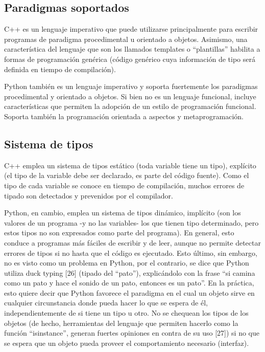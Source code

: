 \subsection{Paradigmas soportados}

C++ es un lenguaje imperativo que puede utilizarse principalmente para escribir
programas de paradigma procedimental u orientado a objetos. Asimismo, una
característica del lenguaje que son los llamados templates o ``plantillas''
habilita a formas de programación genérica (código genérico cuya información de
tipo será definida en tiempo de compilación).

Python también es un lenguaje imperativo y soporta fuertemente los paradigmas
procedimental y orientado a objetos. Si bien no es un lenguaje funcional,
incluye características que permiten la adopción de un estilo de programación
funcional. Soporta también la programación orientada a aspectos y
metaprogramación.

\subsection{Sistema de tipos}

C++ emplea un sistema de tipos estático (toda variable tiene un tipo),
explícito (el tipo de la variable debe ser declarado, es parte del código
fuente). Como el tipo de cada variable se conoce en tiempo de compilación,
muchos errores de tipado son detectados y prevenidos por el compilador.

Python, en cambio, emplea un sistema de tipos dinámico, implícito (son los
valores de un programa -y no las variables- los que tienen tipo determinado,
pero estos tipos no son expresados como parte del programa). En general, esto
conduce a programas más fáciles de escribir y de leer, aunque no permite
detectar errores de tipos si no hasta que el código es ejecutado. Esto último,
sin embargo, no es visto como un problema en Python, por el contrario, se dice
que Python utiliza duck typing [26] (tipado del ``pato''), explicándolo con la
frase ``si camina como un pato y hace el sonido de un pato, entonces es un
pato''. En la práctica, esto quiere decir que Python favorece el paradigma en el
cual un objeto sirve en cualquier circunstancia donde pueda hacer lo que se
espera de él, independientemente de si tiene un tipo u otro. No se chequean los
tipos de los objetos (de hecho, herramientas del lenguaje que permiten hacerlo
como la función ``isinstance'', generan fuertes opiniones en contra de su uso
[27]) si no que se espera que un objeto pueda proveer el comportamiento
necesario (interfaz).

